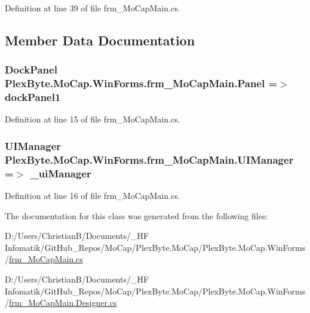 Definition at line 39 of file frm\+\_\+\+Mo\+Cap\+Main.\+cs.



\subsection{Member Data Documentation}
\subsubsection[{\texorpdfstring{Panel}{Panel}}]{\setlength{\rightskip}{0pt plus 5cm}Dock\+Panel Plex\+Byte.\+Mo\+Cap.\+Win\+Forms.\+frm\+\_\+\+Mo\+Cap\+Main.\+Panel =$>$ dock\+Panel1}\hypertarget{class_plex_byte_1_1_mo_cap_1_1_win_forms_1_1frm___mo_cap_main_a523b01d4a9ec5573c7e42b439644c9ee}{}\label{class_plex_byte_1_1_mo_cap_1_1_win_forms_1_1frm___mo_cap_main_a523b01d4a9ec5573c7e42b439644c9ee}


Definition at line 15 of file frm\+\_\+\+Mo\+Cap\+Main.\+cs.

\subsubsection[{\texorpdfstring{U\+I\+Manager}{UIManager}}]{\setlength{\rightskip}{0pt plus 5cm}U\+I\+Manager Plex\+Byte.\+Mo\+Cap.\+Win\+Forms.\+frm\+\_\+\+Mo\+Cap\+Main.\+U\+I\+Manager =$>$ \+\_\+ui\+Manager}\hypertarget{class_plex_byte_1_1_mo_cap_1_1_win_forms_1_1frm___mo_cap_main_a33aa80ec18c499177631895f86eec5ba}{}\label{class_plex_byte_1_1_mo_cap_1_1_win_forms_1_1frm___mo_cap_main_a33aa80ec18c499177631895f86eec5ba}


Definition at line 16 of file frm\+\_\+\+Mo\+Cap\+Main.\+cs.



The documentation for this class was generated from the following files\+:\begin{DoxyCompactItemize}
\item 
D\+:/\+Users/\+Christian\+B/\+Documents/\+\_\+\+H\+F Infomatik/\+Git\+Hub\+\_\+\+Repos/\+Mo\+Cap/\+Plex\+Byte.\+Mo\+Cap/\+Plex\+Byte.\+Mo\+Cap.\+Win\+Forms/\hyperlink{frm___mo_cap_main_8cs}{frm\+\_\+\+Mo\+Cap\+Main.\+cs}\item 
D\+:/\+Users/\+Christian\+B/\+Documents/\+\_\+\+H\+F Infomatik/\+Git\+Hub\+\_\+\+Repos/\+Mo\+Cap/\+Plex\+Byte.\+Mo\+Cap/\+Plex\+Byte.\+Mo\+Cap.\+Win\+Forms/\hyperlink{frm___mo_cap_main_8_designer_8cs}{frm\+\_\+\+Mo\+Cap\+Main.\+Designer.\+cs}\end{DoxyCompactItemize}
